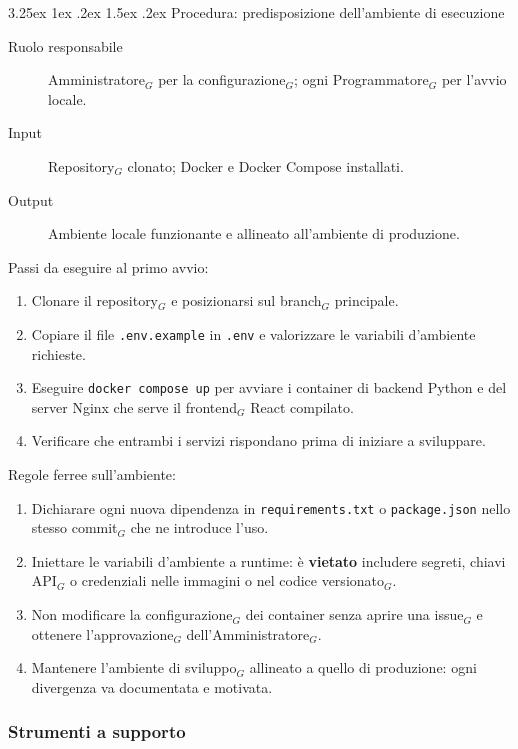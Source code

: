 \documentclass[a4paper, 10pt]{article}
\makeatletter
\renewcommand\paragraph{\@startsection{paragraph}{4}{\z@}%
  {3.25ex \@plus1ex \@minus .2ex}%
  {1.5ex \@plus .2ex}%
  {\normalfont\normalsize\bfseries}}
\makeatother
\begin{document}
\paragraph{Procedura: predisposizione dell'ambiente di esecuzione}

\begin{description}
    \item[Ruolo responsabile] Amministratore$_G$ per la configurazione$_G$; ogni Programmatore$_G$ per l'avvio locale.
    \item[Input] Repository$_G$ clonato; Docker e Docker Compose installati.
    \item[Output] Ambiente locale funzionante e allineato all'ambiente di produzione.
\end{description}

\noindent Passi da eseguire al primo avvio:
\begin{enumerate}
    \item Clonare il repository$_G$ e posizionarsi sul branch$_G$ principale.
    \item Copiare il file \texttt{.env.example} in \texttt{.env} e valorizzare le variabili d'ambiente richieste.
    \item Eseguire \texttt{docker compose up} per avviare i container di backend Python e del server Nginx che serve il frontend$_G$ React compilato.
    \item Verificare che entrambi i servizi rispondano prima di iniziare a sviluppare.
\end{enumerate}

\noindent Regole ferree sull'ambiente:
\begin{enumerate}
    \item Dichiarare ogni nuova dipendenza in \texttt{requirements.txt} o \texttt{package.json} nello stesso commit$_G$ che ne introduce l'uso.
    \item Iniettare le variabili d'ambiente a runtime: è \textbf{vietato} includere segreti, chiavi API$_G$ o credenziali nelle immagini o nel codice versionato$_G$.
    \item Non modificare la configurazione$_G$ dei container senza aprire una issue$_G$ e ottenere l'approvazione$_G$ dell'Amministratore$_G$.
    \item Mantenere l'ambiente di sviluppo$_G$ allineato a quello di produzione: ogni divergenza va documentata e motivata.
\end{enumerate}

\subsubsection{Strumenti a supporto}
\end{document}

